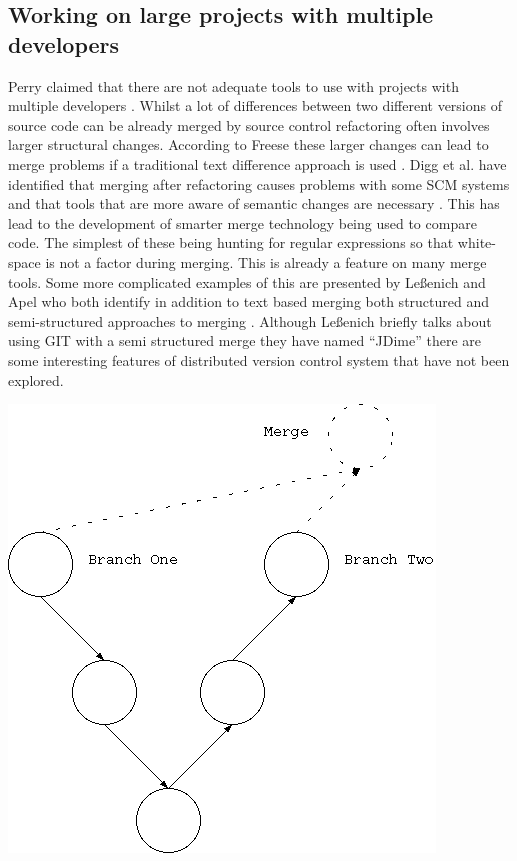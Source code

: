 \documentclass[12pt]{CRPITStyle}
\renewcommand{\cite}{\citep}
\begin{document}
\subsection{Working on large projects with multiple developers}
Perry claimed that there are not adequate tools to use with projects with multiple developers \cite{Perry2001} . Whilst a lot of differences between two different versions of source code can be already merged by source control refactoring often involves larger structural changes. According to Freese these larger changes can lead to merge problems if a traditional text difference approach is used \cite{freese2007operation}. Digg et al. have identified that merging after refactoring causes problems with some SCM systems and that tools that are more aware of semantic changes are necessary \cite{Dig2008}. This has lead to the development of smarter merge technology being used to compare code. The simplest of these being hunting for regular expressions so that white-space is not a factor during merging. This is already a feature on many merge tools. Some more complicated examples of this are presented by Le{\ss}enich and Apel who both identify in addition to text based merging both structured and semi-structured approaches to merging \cite{LeBenich2012} \cite{Apel2011}. Although Le{\ss}enich briefly talks about using GIT with a semi structured merge they have named ``JDime'' there are some interesting features of distributed version control system that have not been explored.

\begin{center}
\includegraphics[scale=0.5]{git-diag}
\end{center}
\end{document}
